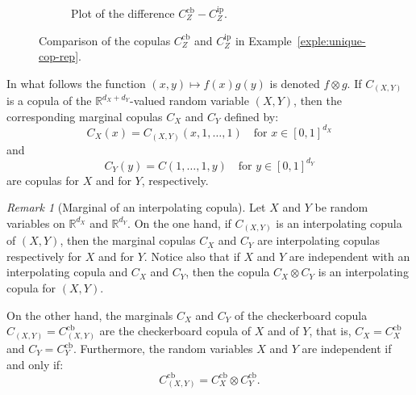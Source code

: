 \documentclass[12pt]{article}
\newcommand{\R}{{\mathbb R}}
\newcommand{\Cb}{C^\mathrm{cb}}
\newcommand{\Cip}{C^\mathrm{ip}}
\theoremstyle{plain}
\theoremstyle{remark}
\newtheorem{rem}{Remark}
\begin{document}
\begin{figure}[htbp]
\begin{subfigure}[t]{0.49\textwidth}
            \caption{Plot of the difference  $\Cb_Z-\Cip_Z$.}
        \end{subfigure}
        \caption{Comparison of the copulas $\Cb_Z$ and $\Cip_Z$ in Example~\ref{exple:unique-cop-rep}.}
        \label{fig:comparaison_checkerboard_copula_interpolating_copula}
    \end{figure}



  In  what follows  the  function $(x,y)\mapsto  f(x)  g(y)$ is  denoted
  $f   \otimes    g$.    If   $C_{(X,Y)}$    is   a   copula    of   the
  $\R^{d_X+d_Y}$-valued random variable $(X,  Y)$, then the corresponding
  marginal copulas $C_X$ and $C_Y$ defined by:
   \[
    C_X(x)=C_{(X,Y)}(x,1, \ldots,1)
    \quad\text{for $x\in [0, 1]^{d_X}$}
    \]
    and
    \[
     C_Y(y)=C(1, \ldots, 1, y)
    \quad\text{for $y\in [0, 1]^{d_Y}$}
  \]
 are copulas for $X$ and for $Y$, respectively. 


\begin{rem}[Marginal of an interpolating  copula]
  \label{rem:damier-2d}
 Let $X$ and $Y$ be random variables on 
 $\R^{d_X}$ and $\R^{d_Y}$.
 On the one hand,  if  $C_{(X,Y)}$ is an interpolating
  copula  of $(X, Y)$, then the
  marginal copulas $C_X$ and $C_Y$ are    interpolating  copulas  respectively for $X$ and for $Y$.   Notice  also   that  if
  $X$ and $Y$ are independent with  an interpolating copula and
  $C_X$ and $C_Y$, then the copula  $C_X\otimes C_Y$ is an
  interpolating copula for $(X,Y)$. 
  
On the other hand, the marginals $C_X$ and $C_Y$ of 
the checkerboard  copula $C_{(X,Y)}=\Cb_{(X,Y)}$
are  the 
checkerboard  copula of $X$ and of $Y$, that is,
$C_X= \Cb_X$ and $C_Y=\Cb_Y$. 
Furthermore, the random variables $X$ and $Y$ are independent if and
only if: 
\[
  \Cb_{(X,Y)}=\Cb_{X}\otimes \Cb_{Y}.
\]
\end{rem}
\end{document}
